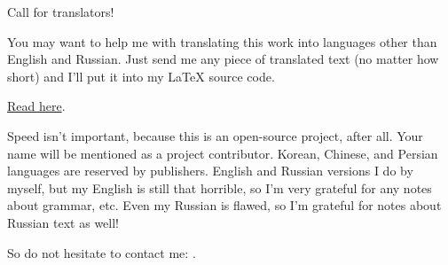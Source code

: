 \vspace*{\fill}

\Huge Call for translators!

\normalsize

\bigskip
\bigskip
\bigskip

You may want to help me with translating this work into languages other than English and Russian.
Just send me any piece of translated text (no matter how short) and I'll put it into my LaTeX source code.

\href{https://github.com/dennis714/RE-for-beginners/blob/master/Translation.md}{Read here}.

Speed isn't important, because this is an open-source project, after all.
Your name will be mentioned as a project contributor.
Korean, Chinese, and Persian languages are reserved by publishers.
English and Russian versions I do by myself, but my English is still that horrible, so I'm very grateful for any notes about grammar, etc.
Even my Russian is flawed, so I'm grateful for notes about Russian text as well!%

So do not hesitate to contact me: \GTT{\EMAIL}.

\vspace*{\fill}
\vfill
